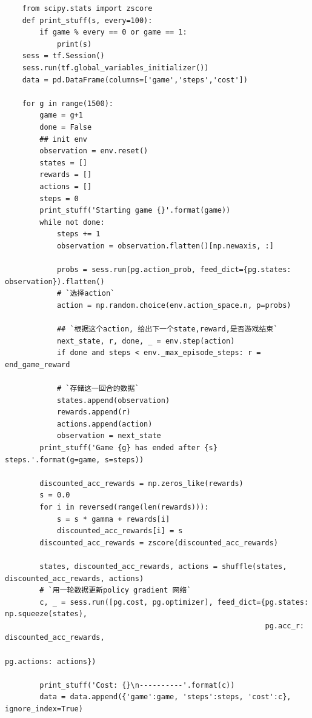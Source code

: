 \documentclass[fontset=windows,openany,UTF8]{ctexbook}
\begin{document}
\lstset{language=python}
\begin{lstlisting}
    from scipy.stats import zscore
    def print_stuff(s, every=100):
        if game % every == 0 or game == 1:
            print(s)
    sess = tf.Session()
    sess.run(tf.global_variables_initializer())
    data = pd.DataFrame(columns=['game','steps','cost'])
    
    for g in range(1500):
        game = g+1
        done = False
        ## init env
        observation = env.reset()
        states = [] 
        rewards = [] 
        actions = []
        steps = 0
        print_stuff('Starting game {}'.format(game))
        while not done:
            steps += 1
            observation = observation.flatten()[np.newaxis, :]
            
            probs = sess.run(pg.action_prob, feed_dict={pg.states: observation}).flatten()
            # `选择action`
            action = np.random.choice(env.action_space.n, p=probs)
    
            ## `根据这个action, 给出下一个state,reward,是否游戏结束`
            next_state, r, done, _ = env.step(action)
            if done and steps < env._max_episode_steps: r = end_game_reward
            
            # `存储这一回合的数据`
            states.append(observation)
            rewards.append(r)
            actions.append(action)
            observation = next_state
        print_stuff('Game {g} has ended after {s} steps.'.format(g=game, s=steps))
        
        discounted_acc_rewards = np.zeros_like(rewards)
        s = 0.0
        for i in reversed(range(len(rewards))):
            s = s * gamma + rewards[i]
            discounted_acc_rewards[i] = s
        discounted_acc_rewards = zscore(discounted_acc_rewards)
        
        states, discounted_acc_rewards, actions = shuffle(states, discounted_acc_rewards, actions)
        # `用一轮数据更新policy gradient 网络`
        c, _ = sess.run([pg.cost, pg.optimizer], feed_dict={pg.states: np.squeeze(states), 
                                                            pg.acc_r: discounted_acc_rewards,
                                                            pg.actions: actions})    
        
        print_stuff('Cost: {}\n----------'.format(c))
        data = data.append({'game':game, 'steps':steps, 'cost':c}, ignore_index=True)
\end{lstlisting}
\end{document}
